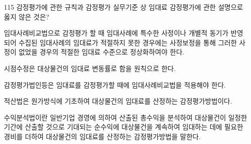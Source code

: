 \begin{question}{115}
감정평가에 관한 규칙과 감정평가 실무기준 상 임대료 감정평가에 관한 설명으로 옳지 않은 것은?
\begin{choices}
  \item 임대사례비교법으로 감정평가 할 때 임대사례에 특수한 사정이나 개별적 동기가 반영되어 수집된 임대사례의 임대료가 적절하지 못한 경우에는 사정보정을 통해 그러한 사정이 없었을 경우의 적절한 임대료 수준으로 정상화하여야 한다.
  \item 시점수정은 대상물건의 임대료 변동률로 함을 원칙으로 한다.
  \item 감정평가법인등은 임대료를 감정평가할 때에 임대사례비교법을 적용해야 한다.
  \item 적산법은 원가방식에 기초하여 대상물건의 임대료를 산정하는 감정평가방법이다.
  \item 수익분석법이란 일반기업 경영에 의하여 산출된 총수익을 분석하여 대상물건이 일정한 기간에 산출할 것으로 기대되는 순수익에 대상물건을 계속하여 임대하는 데에 필요한 경비를 더하여 대상물건의 임대료를 산정하는 감정평가방법을 말한다.
\end{choices}
\end{question}
